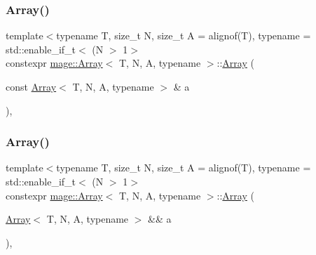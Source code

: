 \mbox{\label{structmage_1_1_array_a8dc58948e15554f715b280a72140a1f4}} 
\subsubsection{\texorpdfstring{Array()}{Array()}\hspace{0.1cm}{\footnotesize\ttfamily [8/10]}}
{\footnotesize\ttfamily template$<$typename T, size\+\_\+t N, size\+\_\+t A = alignof(\+T), typename  = std\+::enable\+\_\+if\+\_\+t$<$ (\+N $>$ 1$>$ \\
constexpr \mbox{\hyperlink{structmage_1_1_array}{mage\+::\+Array}}$<$ T, N, A, typename $>$\+::\mbox{\hyperlink{structmage_1_1_array}{Array}} (\begin{DoxyParamCaption}\item[{const \mbox{\hyperlink{structmage_1_1_array}{Array}}$<$ T, N, A, typename $>$ \&}]{a }\end{DoxyParamCaption})\hspace{0.3cm}{\ttfamily [default]}, {\ttfamily [noexcept]}}

\mbox{\label{structmage_1_1_array_a4cf0fb395b42d53b6e59868739dc9613}} 
\subsubsection{\texorpdfstring{Array()}{Array()}\hspace{0.1cm}{\footnotesize\ttfamily [9/10]}}
{\footnotesize\ttfamily template$<$typename T, size\+\_\+t N, size\+\_\+t A = alignof(\+T), typename  = std\+::enable\+\_\+if\+\_\+t$<$ (\+N $>$ 1$>$ \\
constexpr \mbox{\hyperlink{structmage_1_1_array}{mage\+::\+Array}}$<$ T, N, A, typename $>$\+::\mbox{\hyperlink{structmage_1_1_array}{Array}} (\begin{DoxyParamCaption}\item[{\mbox{\hyperlink{structmage_1_1_array}{Array}}$<$ T, N, A, typename $>$ \&\&}]{a }\end{DoxyParamCaption})\hspace{0.3cm}{\ttfamily [default]}, {\ttfamily [noexcept]}}

\mbox{\label{structmage_1_1_array_a950b26208c3546704f42e92c312a93ed}} 

